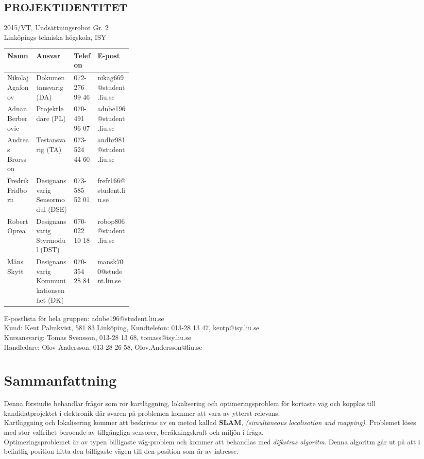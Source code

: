 \documentclass[12pt]{article}
\begin{document}
	\pagebreak
	\begin{center}
		
		\section*{PROJEKTIDENTITET}
		2015/VT, Undsättningsrobot Gr. 2
		\\
		Linköpings tekniska högskola, ISY
		\\[0.5in]
		\begin{table}[h]
			\begin{tabular}{|l|p{0.3\linewidth}|l|l|} \hline
				Namn & Ansvar & Telefon & E-post \\[0.1in] \hline
				Nikolaj Agafonov & Dokumentansvarig (DA) & 072-276 99 46 & nikag669@student.liu.se \\ \hline
				Adnan Berberovic & Projektledare (PL) & 070-491 96 07 & adnbe196@student.liu.se \\ \hline
				Andreas Brorsson & Testansvarig (TA) & 073-524 44 60 & andbr981@student.liu.se \\ \hline
				Fredrik Fridborn & Designansvarig Sensormodul (DSE) & 073-585 52 01 & frefr166@student.liu.se \\ \hline
				Robert Oprea & Designansvarig Styrmodul (DST) & 070-022 10 18 & robop806@student.liu.se \\ \hline
				Måns Skytt & Designansvarig Kommunikationsenhet (DK) & 070-354 28 84 & mansk700@student.liu.se \\ \hline
			\end{tabular}
		\end{table}
		
		E-postlista för hela gruppen: adnbe196@student.liu.se
		\\[1in]
		Kund: Kent Palmkvist, 581 83 Linköping,
		Kundtelefon: 013-28 13 47, kentp@isy.liu.se
		\\[1in]
		Kursansvarig: Tomas Svensson, 013-28 13 68, tomass@isy.liu.se
		\\
		Handledare: Olov Andersson, 013-28 26 58, Olov.Andersson@liu.se
	\end{center}
	\pagebreak
	\setcounter{secnumdepth}{0} %
	\section*{Sammanfattning}
	Denna förstudie behandlar frågor som rör kartläggning, lokalisering och optimeringsproblem för kortaste väg och kopplas till kandidatprojektet i elektronik där svaren på problemen kommer att vara av ytterst relevans.\\[0.1in]
	Kartläggning och lokalisering kommer att beskrivas av en metod kallad \textbf{SLAM}, \textit{(simultaneous localisation and mapping)}. Problemet löses med stor valfrihet beroende av tillgängliga sensorer, beräkningskraft och miljön i fråga.\\[0.1in]
	Optimeringsproblemet är av typen billigaste väg-problem och kommer att behandlas med \textit{dijkstras algoritm}. Denna algoritm går ut på att i befintlig position hitta den billigaste vägen till den position som är av intresse.
	
\end{document}
